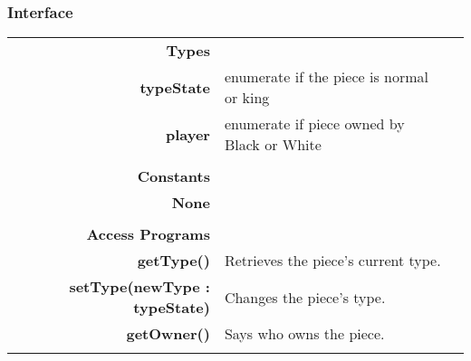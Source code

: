 \documentclass[10pt]{article}
\begin{document}
    \subsubsection{Interface}
        \begin{tabularx}{\linewidth}{@{} >{\bfseries}r Xp{5cm} }
            Types           & \begin{tabular}[t]{@{} l p{8cm}} 
                                     & \\
                                    typeState & enumerate if the piece is normal or king \\
                                    player & enumerate if piece owned by Black or White \\
                              \end{tabular} \\
                              
            Constants       & \begin{tabular}[t]{@{} l p{8cm}} 
                                     & \\
                                    None & \\
                              \end{tabular} \\

            Access Programs & \begin{tabular}[t]{@{} l p{8cm}}
                                     & \\
                                    getType() & Retrieves the piece's current type. \\
                                    setType(newType : typeState) & Changes the piece's type. \\ 
                                    getOwner() & Says who owns the piece. \\
                              \end{tabular}
        \end{tabularx}
        
\end{document}

